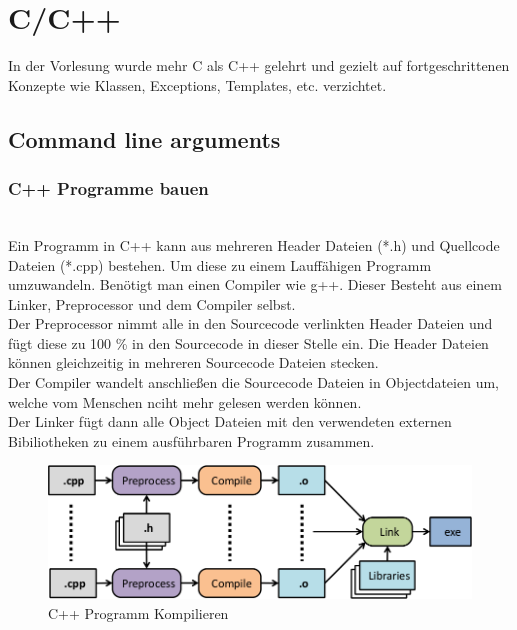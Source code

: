 \chapter{C/C++}
\label{sec:C/C++}
In der Vorlesung wurde mehr C als C++ gelehrt und gezielt auf fortgeschrittenen Konzepte wie Klassen, Exceptions, Templates, etc. verzichtet. 

\section{Command line arguments}
\subsection{C++ Programme bauen}\qquad\\
Ein Programm in C++ kann aus mehreren Header Dateien (*.h) und Quellcode Dateien (*.cpp) bestehen. Um diese zu einem Lauffähigen Programm umzuwandeln. Benötigt man einen Compiler wie g++. Dieser Besteht aus einem Linker, Preprocessor und dem Compiler selbst. \\
Der Preprocessor nimmt alle in den Sourcecode verlinkten Header Dateien und fügt diese zu 100 \% in den Sourcecode in dieser Stelle ein. Die Header Dateien können gleichzeitig in mehreren Sourcecode Dateien stecken. \\
Der Compiler wandelt anschließen die Sourcecode Dateien in Objectdateien um, welche vom Menschen nciht mehr gelesen werden können.\\
Der Linker fügt dann alle Object Dateien mit den verwendeten externen Bibiliotheken zu einem ausführbaren Programm zusammen.\\
\begin{figure}[h]
\centering
\includegraphics[width=0.75\linewidth]{mainmatter/pics/comp}
\caption[compiling]{C++ Programm Kompilieren}
\label{fig:comp}
\end{figure}
